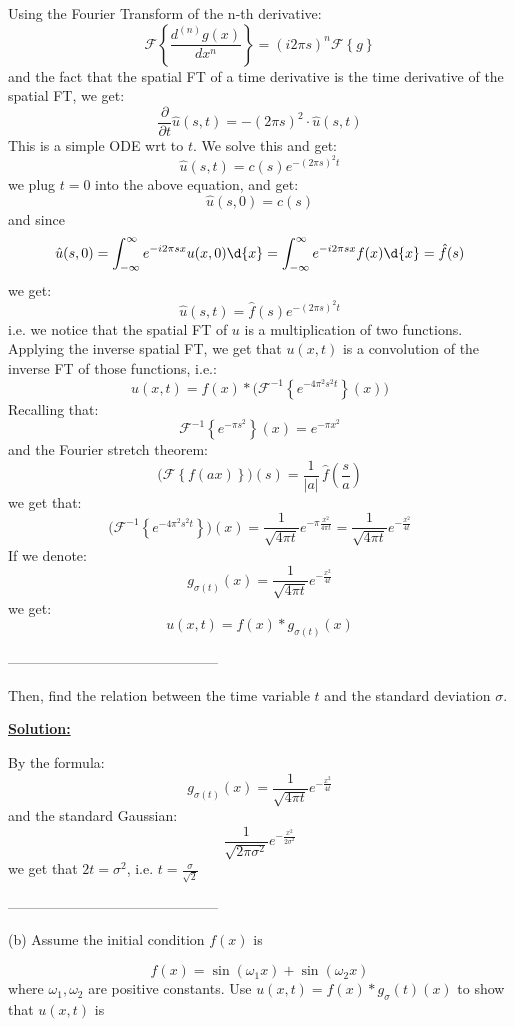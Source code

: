 \documentclass{article}
\begin{document}
Using the Fourier Transform of the n-th derivative:
\[
  \mathcal{F} \left\{ \frac{d^{(n)}g(x)}{d x^n}  \right\} = (i 2\pi s )^{n} \mathcal{F} \left\{ g \right\}
\]
and the fact that the spatial FT of a time derivative is the time derivative of the spatial FT, we get:
\[
  \frac{\partial }{\partial t} \hat{u}(s,t) = - (2 \pi s)^2  \cdot  \hat{u}(s,t)   
\]
This is a simple ODE wrt to $t$. We solve this  and get:
\[
  \hat{u}(s,t) = c(s) e^{- (2 \pi s)^2 t}  
\]
we plug $t=0$ into the above equation, and get:
\[
  \hat{u}(s,0) = c(s) 
\]
and since
\[
  \hat{u}(s,0) = \int_{-\infty}^{\infty} e^{-i 2 \pi s x} u(x,0) \d{x} = \int_{-\infty}^{\infty} e^{-i 2 \pi s x} f(x) \d{x} = \hat{f}(s)  
\]
we get:
\[
  \hat{u}(s,t) = \hat{f}(s) e^{-(2 \pi s) ^2 t}   
\]
i.e. we notice that the spatial FT of $u$ is a multiplication of two functions. Applying the inverse spatial FT, we get that $u(x,t)$ is a convolution of the inverse FT of those functions, i.e.:
\[
  u(x,t) = f(x) \ast \Big( \mathcal{F}^{-1} \left\{ e^{-4 \pi^2 s ^2 t}  \right\} (x) \Big)
\]
Recalling that:
\[
  \mathcal{F}^{-1} \left\{ e^{- \pi s ^2}  \right\}(x) = e^{- \pi x ^2} 
\]
and the Fourier stretch theorem:
\[
  \big(\mathcal{F} \left\{ f(ax) \right\}\big)(s) = \frac{1}{|a|} \, \hat{f}(\frac{s}{a}) 
\]
we get that:
\[
  \big( \mathcal{F} ^{-1}  \left\{ e^{ - 4 \pi ^2 s ^2 t} \right\} \big) (x) =  \frac{1}{\sqrt{ 4 \pi t }} e^{ - \pi \frac{x ^2}{4 \pi t}}  = \frac{1}{\sqrt{  4 \pi t }} e^{ - \frac{x ^2}{4t}} 
\]
If we denote:
\[
  g_{\sigma (t)}(x) = \frac{1}{\sqrt{ 4 \pi t }} e^{- \frac{x ^2}{4t}} 
\]
we get:
\[
  \boxed  {u(x,t) = f(x) \ast g_{\sigma(t)}(x)}
\]

--------------------------------------------- 

Then, find the relation between the time variable \(t\) and the standard deviation \(\sigma\).

\textbf{\ul{Solution:}}

By the formula:
\[
  g_{\sigma (t)}(x) = \frac{1}{\sqrt{ 4 \pi t }} e^{- \frac{x ^2}{4t}} 
\]
and the standard Gaussian:
\[
  \frac{1}{\sqrt{ 2 \pi \sigma ^2 }} e^{- \frac{x ^2}{2 \sigma ^2}} 
\]
we get that $2t = \sigma ^2$, i.e. $t = \frac{\sigma}{\sqrt{ 2 }}$

---------------------------------------------

(b) Assume the initial condition \(f(x)\) is

\begin{equation}
f(x) = \sin(\omega_1 x) + \sin(\omega_2 x)
\end{equation}
where \(\omega_1, \omega_2\) are positive constants. Use $u(x,t) = f(x) * g_\sigma(t)(x)
 $ to show that \(u(x,t)\) is 
\end{document}
